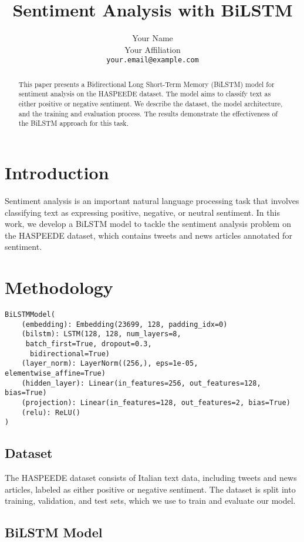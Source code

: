 \documentclass[11pt,a4paper]{article}
\title{Sentiment Analysis with BiLSTM}
\author{Your Name \\ 
    Your Affiliation \\
    \texttt{your.email@example.com}}
\date{}
\begin{document}
\maketitle

\begin{abstract}
This paper presents a Bidirectional Long Short-Term Memory (BiLSTM) model for sentiment analysis on the HASPEEDE dataset. The model aims to classify text as either positive or negative sentiment. We describe the dataset, the model architecture, and the training and evaluation process. The results demonstrate the effectiveness of the BiLSTM approach for this task.
\end{abstract}

\section{Introduction}
Sentiment analysis is an important natural language processing task that involves classifying text as expressing positive, negative, or neutral sentiment. In this work, we develop a BiLSTM model to tackle the sentiment analysis problem on the HASPEEDE dataset, which contains tweets and news articles annotated for sentiment.

\section{Methodology}
\begin{verbatim}
BiLSTMModel(
    (embedding): Embedding(23699, 128, padding_idx=0)
    (bilstm): LSTM(128, 128, num_layers=8,
     batch_first=True, dropout=0.3,
      bidirectional=True)
    (layer_norm): LayerNorm((256,), eps=1e-05, elementwise_affine=True)
    (hidden_layer): Linear(in_features=256, out_features=128, bias=True)
    (projection): Linear(in_features=128, out_features=2, bias=True)
    (relu): ReLU()
)
\end{verbatim}
\subsection{Dataset}
The HASPEEDE dataset consists of Italian text data, including tweets and news articles, labeled as either positive or negative sentiment. The dataset is split into training, validation, and test sets, which we use to train and evaluate our model.

\subsection{BiLSTM Model}
\end{document}
